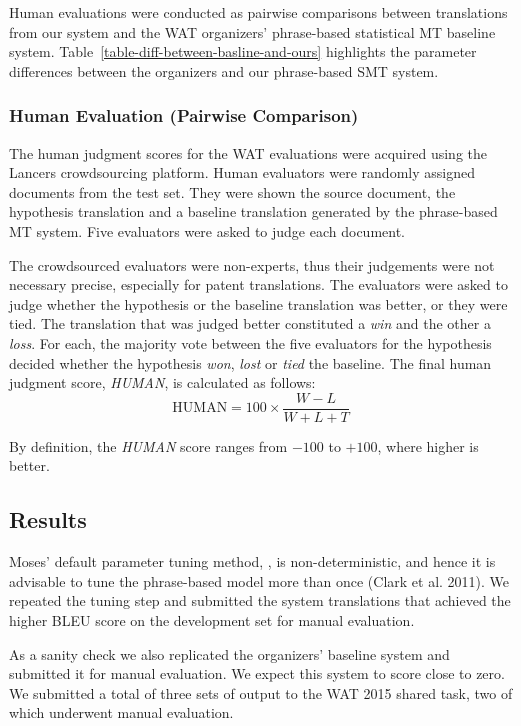 Human evaluations were conducted as pairwise comparisons between translations from our system and the WAT organizers' phrase-based statistical MT baseline system. Table~\ref{table-diff-between-basline-and-ours} highlights the parameter differences between the organizers and our phrase-based SMT system. 

\subsubsection{Human Evaluation (Pairwise Comparison)}

The human judgment scores for the WAT evaluations were acquired using the Lancers crowdsourcing platform.
Human evaluators were randomly assigned documents from the test set.
They were shown the source document, %
the hypothesis translation and a baseline translation generated by the phrase-based MT system.
Five evaluators were asked to judge each document.

The crowdsourced evaluators were non-experts, thus their judgements were not necessary precise, especially for patent translations. The evaluators were asked to judge whether the hypothesis or the baseline translation was better, or they were tied. The translation that was judged better constituted a \emph{win} and the other a \emph{loss}. For each, the majority vote between the five evaluators for the hypothesis decided whether the hypothesis \emph{won}, \emph{lost} or \emph{tied} the baseline.  The final human judgment score, \emph{HUMAN}, is calculated as follows:
\begin{equation}
	\text{HUMAN} = 100 \times \frac { W-L }{ W+L+T }
\end{equation}

By definition, the \emph{HUMAN} score ranges from $-100$ to $+100$, where higher is better.

\subsection{Results}

Moses' default parameter tuning method, \mert{}, is non-deterministic, and hence it is advisable to tune the phrase-based model more than once (Clark et al. 2011). We repeated the tuning step and submitted the system translations that achieved the higher BLEU score on the development set for manual evaluation.

As a sanity check we also replicated the organizers' baseline system and submitted it for manual evaluation. We expect this system to score close to zero. We submitted a total of three sets of output to the WAT 2015 shared task, two of which underwent manual evaluation.

